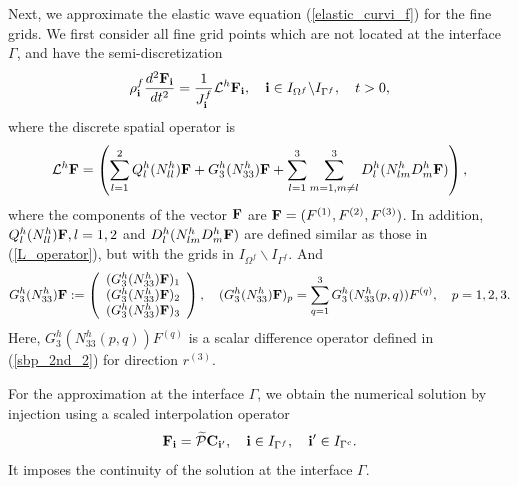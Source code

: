 Next, we approximate the elastic wave equation (\ref{elastic_curvi_f}) for the fine grids. We first consider all fine grid points which are not located at the interface $\Gamma$, and have the semi-discretization
\begin{equation}\label{elastic_semi_f}
{\rho}_{\bf i}^{f}\frac{d^2{{\bf F}_{\bf i}}}{dt^2} = \frac{1}{J^f_{\bf i}}{\mathcal{L}}^{h} {{\bf F}}_{\bf i},\quad {\bf i}\in I_{\Omega^f}\backslash I_{{\Gamma^f}},\quad t>0,
\end{equation}
where the discrete spatial operator is
\begin{equation}\label{Lf_operator}
{\mathcal{L}}^{h} {{\bf F}} = \left(\sum_{l=1}^2{Q}_l^{h}({N}_{ll}^h){\bf F}+{G}_3^{h}({N}_{33}^h){\bf F}+\sum_{l=1}^3\sum_{m=1,m\neq l}^3{D}_l^{h}({N}_{lm}^{h}{D}_m^{h}{\bf F})\right),
\end{equation}
where the components of the vector ${\bf F}$ are ${\bf F} = (F^{(1)}, F^{(2)}, F^{(3)})$. In addition, ${Q}_l^{h}({N}_{ll}^h){\bf F}, l = 1,2$ and ${D}_l^{h}({N}_{lm}^{h}{D}_m^{h}{\bf F})$ are defined similar as those in (\ref{L_operator}), but with the grids in $I_{\Omega^f}\backslash I_{{\Gamma^f}}$. And
\begin{align*}
{{G}}_3^{h}({N}_{33}^{h}){\bf F} := \left(\begin{array}{c}
({{G}}_3^{h}({N}_{33}^{h}){\bf F})_1 \\
({{G}}_3^{h}({N}_{33}^{h}){\bf F})_2 \\
({{G}}_3^{h}({N}_{33}^{h}){\bf F})_3 
\end{array}\right), \quad ({{G}}_3^{h}({N}_{33}^{h}){\bf F})_p = \sum_{q = 1}^{3} {G}_3^{h}(N_{33}^{h}(p,q)) {F}^{(q)},\quad p = 1,2,3.
\end{align*}
Here, ${G}_3^{h}(N_{33}^{h}(p,q)) {F}^{(q)}$ is a scalar difference operator defined in (\ref{sbp_2nd_2}) for direction $r^{(3)}$. 

For the approximation at the interface $\Gamma$, we obtain the numerical solution by injection using a scaled interpolation operator
\begin{equation}\label{continuous_sol}
{\bf F}_{\bf i} = \wt{\mathcal{P}}{\bf C}_{{\bf i}'},\quad {\bf i}\in I_{\Gamma^f},\quad {{\bf i}'}\in I_{\Gamma^c}.
\end{equation}
It imposes the continuity of the solution at the interface $\Gamma$. 

